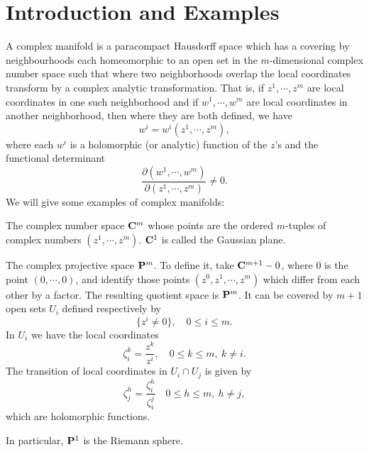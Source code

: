 \chapter{Introduction and Examples}
A complex manifold is a paracompact Hausdorff space which has a covering by neighbourhoods each homeomorphic to an open set in the $m$-dimensional complex number space such that where two neighborhoods overlap the local coordinates transform by a complex analytic transformation. That is, if $z^1,\cdots,z^m$ are local coordinates in one such neighborhood and if $w^1,\cdots,w^m$ are local coordinates in another neighborhood, then where they are both defined, we have 
\[w^i=w^i(z^1,\cdots,z^m),\]
where each $w^i$ is a holomorphic (or analytic) function of the $z$'s and the functional determinant 
\[\frac{\partial (w^1,\cdots,w^m)}{\partial (z^1,\cdots,z^m)}\neq 0.\]
We will give some examples of complex manifolds:

\begin{example}
The complex number space $\mathbf{C}^m$ whose points are the ordered $m$-tuples of complex numbers $(z^1,\cdots,z^m)$. $\mathbf{C}^1$ is called the Gaussian plane.
\end{example}
\begin{example}
The complex projective space $\mathbf{P}^m$. To define it, take $\mathbf{C}^{m+1}-0$, where $0$ is the point $(0,\cdots,0)$, and identify those points $(z^0,z^1,\cdots,z^m)$ which differ from each other by a factor. The resulting quotient space is $\mathbf{P}^m$. It can be covered by $m+1$ open sets $U_i$ defined respectively by 
\[\{z^i\neq 0\}, \quad 0\leq i\leq m.\] 
In $U_i$ we have the local coordinates 
\[\zeta_i^k=\frac{z^k}{z^i},\quad 0\leq k\leq m,\ k\neq i.\]
The transition of local coordinates in $U_i\cap U_j$ is given by 
\[\zeta^h_j=\frac{\zeta^h_i}{\zeta^j_i}\quad 0\leq h\leq m,\ h\neq j,\]
which are holomorphic functions.\par
In particular, $\mathbf{P}^1$ is the Riemann sphere.
\end{example}